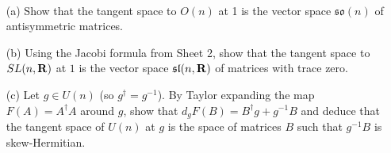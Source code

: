 \documentclass[12pt]{article}
\begin{document}
\iffalse
\begin{answer}
\begin{enumerate}[(a)]
\item We have
\begin{gather*}
[X,Y],C]+[[Y,C],X]+[[C,X],Y]\\
=XYC-YXC-CXY+CYX+YCX-CYX-XYC+XCY\\
+CXY-XCY-YCX+YXC
\end{gather*}
which cancels out if you stare at it for long enough.
\item We have
\begin{align*}
\ad_{[X,Y]}Z&=[[X,Y],Z]\\
           &=-[[Y,Z],X]-[[Z,X],Y]\mbox{ (}\Leftrightarrow\mbox{ Jacobi identity)}\\
           &=[X,[Y,Z]]-[Y,[X,Z]]\\
           &=\ad_X\ad_YZ-\ad_Y\ad_XZ.
\end{align*}
\item We have
  \begin{align*}
    (\exp(A)\exp(B))\exp(C)&=\exp(A+B+\frac{1}{2}[A,B]+\cdots)\exp(C)\\
    &=\exp\left(A+B+\frac{1}{2}[A,B]+C+\frac{1}{2}[A+B,C]+\frac{1}{4}[[A,B],C]+\right.\\
    &\ \ \ \ \ \left.+\frac{1}{12}([A+B,[A+B,C]]-[C,[A+B,C]]+\cdots)\right)\\
    \exp(A)(\exp(B)\exp(C))&=\exp(A)\exp(B+C+\frac{1}{2}[B,C]+\cdots)\\
    &=\exp\left(A+B+C+\frac{1}{2}[B,C]+\frac{1}{2}[A,B+C]+\frac{1}{4}[A,[B,C]]+\right.\\
    &\ \ \ \ \ \left.+\frac{1}{12}([A,[A,B+C]]-[B+C,[A,B+C]])+\cdots\right)
  \end{align*}
  so comparing cubic terms which contain precisely one $A$, one $B$ and one $C$ we get
  \[\frac{1}{4}[[A,B],C]+\frac{1}{12}[A,[B,C]]+\frac{1}{12}[B,[A,C]]=\frac{1}{4}[A,[B,C]]-\frac{1}{12}[B,[A,C]]-\frac{1}{12}[C,[A,B]]\]
  which eventually simplifies (using the fact that $[X,Y]=-[Y,X]$) to the Jacobi identity.
\end{enumerate}
\end{answer}
\newpage
\fi

\bigskip

\begin{question}\ \\
\begin{enumerate}
\item[(a)] Show that the tangent space to $O(n)$ at 1 is the vector space $\mathfrak{so}(n)$ of antisymmetric matrices.
\item[(b)] Using the Jacobi formula from Sheet 2, show that the tangent space to $SL(n,\mathbf{R})$ at $1$ is the vector space $\mathfrak{sl}(n,\mathbf{R})$ of matrices with trace zero.
\item[(c)] Let $g\in U(n)$ (so $g^{\dagger}=g^{-1}$). By Taylor expanding the map $F(A)=A^{\dagger}A$ around $g$, show that $d_gF(B)=B^{\dagger}g+g^{-1}B$ and deduce that the tangent space of $U(n)$ at $g$ is the space of matrices $B$ such that $g^{-1}B$ is skew-Hermitian.
\end{enumerate}
\end{question}
\end{document}
